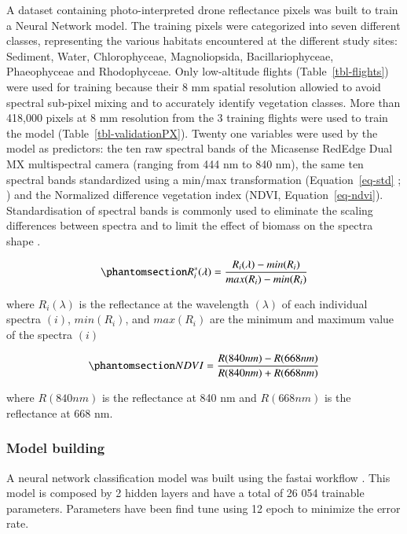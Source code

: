 \documentclass[
  number]{elsarticle}
\begin{document}
A dataset containing photo-interpreted drone reflectance pixels was
built to train a Neural Network model. The training pixels were
categorized into seven different classes, representing the various
habitats encountered at the different study sites: Sediment, Water,
Chlorophyceae, Magnoliopsida, Bacillariophyceae, Phaeophyceae and
Rhodophyceae. Only low-altitude flights (Table~\ref{tbl-flights}) were
used for training because their 8 mm spatial resolution allowied to
avoid spectral sub-pixel mixing and to accurately identify vegetation
classes. More than 418,000 pixels at 8 mm resolution from the 3 training
flights were used to train the model (Table~\ref{tbl-validationPX}).
Twenty one variables were used by the model as predictors: the ten raw
spectral bands of the Micasense RedEdge Dual MX multispectral camera
(ranging from 444 nm to 840 nm), the same ten spectral bands
standardized using a min/max transformation (Equation~\ref{eq-std} ;
\citep{Cao2017}) and the Normalized difference vegetation index (NDVI,
Equation~\ref{eq-ndvi}). Standardisation of spectral bands is commonly
used to eliminate the scaling differences between spectra and to limit
the effect of biomass on the spectra shape \citetext{\citealp[
]{Douay2022}; \citealp{Davies2023}}.

\begin{equation}\phantomsection\label{eq-std}{
R_{i}^{*}(\lambda) = \frac{R_{i}(\lambda) - min(R_{i})}{max(R_{i})- min(R_{i})}
}\end{equation}

where \(R_{i}(\lambda)\) is the reflectance at the wavelength
\((\lambda)\) of each individual spectra \((i)\), \(min(R_{i})\), and
\(max(R_{i})\) are the minimum and maximum value of the spectra \((i)\)

\begin{equation}\phantomsection\label{eq-ndvi}{
NDVI = \frac{R(840nm)-R(668nm)}{R(840nm)+R(668nm)}
}\end{equation}

where \(R(840nm)\) is the reflectance at 840 nm and \(R(668nm)\) is the
reflectance at 668 nm.

\subsubsection{Model building}\label{model-building}

A neural network classification model was built using the fastai
workflow \citep{howard2018fastai}. This model is composed by 2 hidden
layers and have a total of 26 054 trainable parameters. Parameters have
been find tune using 12 epoch to minimize the error rate.
\end{document}
